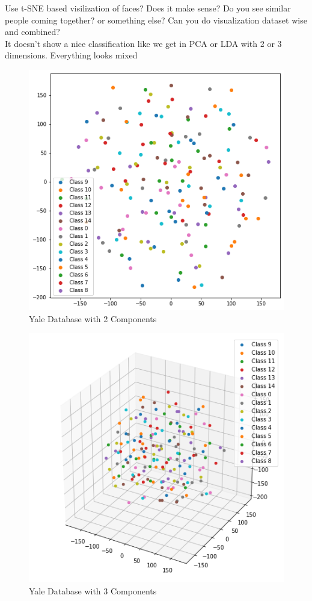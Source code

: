 \documentclass[12pt]{article}
\newenvironment{problem}[2][Problem]{\begin{trivlist}
\item[\hskip \labelsep {\bfseries #1}\hskip \labelsep {\bfseries #2.}]}{\end{trivlist}}
\begin{document}
\begin{problem}{3}
Use t-SNE based visilization of faces? Does it make
sense? Do you see similar people coming together?
or something else? Can you do visualization dataset
wise and combined?
	\\It doesn't show a nice classification like we get in PCA or LDA with 2 or 3 dimensions. Everything looks mixed	
		\begin{figure}[H]
		\centering
		\includegraphics[width=16cm]{Yale_Database_with_2_Components.png}
		\caption{Yale Database with 2 Components}
		\label{fig:verticalcell}
	\end{figure}
	
	
		\begin{figure}[H]
		\centering
		\includegraphics[width=16cm]{Yale_Database_with_3_Components.png}
		\caption{Yale Database with 3 Components}
		\label{fig:verticalcell}
	\end{figure}
	

\end{problem}
\end{document}
